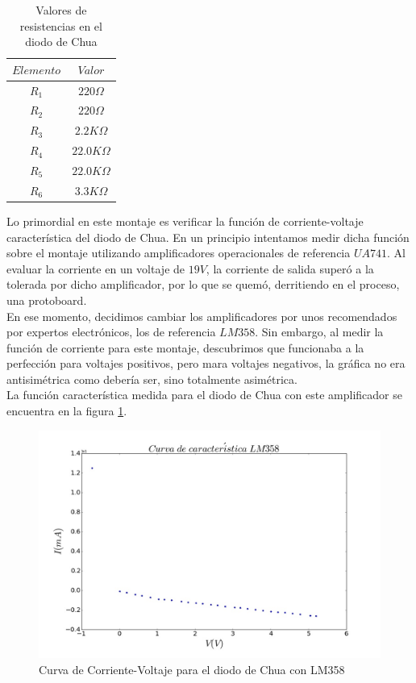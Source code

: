 \documentclass[%
 reprint,
 amsmath,amssymb,
 aps,
]{revtex4-1}
\begin{document}
\begin{table}[h!]
\centering
\begin{tabular}{|c|c|}
	\hline $ Elemento $ & $Valor$ \\ 
	\hline\hline
	$R_1$ & $220 \Omega$ \\
	$R_2$ & $220 \Omega $\\
	$R_3$ & $2.2K \Omega $\\
	$R_4$ & $22.0K \Omega$ \\
	$R_5$ & $22.0K \Omega$ \\
	$R_6$ & $3.3K \Omega $\\
		[1ex] 
 \hline
 \end{tabular} 
  \caption{Valores de resistencias en el diodo de Chua}
\label{table:valoresdiodo} 
\end{table}

Lo primordial en este montaje es verificar la función de corriente-voltaje característica del diodo de Chua. En un principio intentamos medir dicha función sobre el montaje utilizando amplificadores operacionales de referencia $UA741$. Al evaluar la corriente en un voltaje de $19V$, la corriente de salida superó a la tolerada por dicho amplificador, por lo que se quemó, derritiendo en el proceso, una protoboard.\\

En ese momento, decidimos cambiar los amplificadores por unos recomendados por expertos electrónicos, los de referencia $LM358$. Sin embargo, al medir la función de corriente para este montaje, descubrimos que funcionaba a la perfección para voltajes positivos, pero mara voltajes negativos, la gráfica no era antisimétrica como debería ser, sino totalmente asimétrica.\\

La función característica medida para el diodo de Chua con este amplificador se encuentra en la figura \ref{fig:intento1}.\\

\begin{figure}
\centering
\includegraphics[width=0.7\linewidth]{"intento1"}
\caption{Curva de Corriente-Voltaje para el diodo de Chua con LM358}
\label{fig:intento1}
\end{figure}
\end{document}
